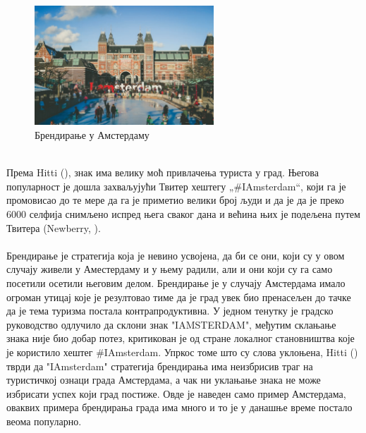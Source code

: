 \documentclass{article}
\begin{document}
\begin{figure}[h!]
\centering
\includegraphics[width=0.6\textwidth]{slike/amsterdam.png}
\caption{\label{fig:amsterdam}Брендирање у Амстердаму}
\end{figure}\\
Према Hitti (\cite{hitti_2018}), знак има велику моћ привлачења туриста у град. Његова популарност је дошла захваљујући Твитер хештегу „#IAmsterdam“, који га је промовисао до те мере да га је приметио велики број људи и да је да је преко 6000 селфија снимљено испред њега сваког дана и већина њих је подељена путем Твитера (Newberry, \cite{nb_2016}). \\\\
Брендирање је стратегија која је невино усвојена, да би се они, који су у овом случају живели у Аместердаму и у њему радили, али и они који су га само посетили осетили његовим делом. Брендирање је у случају Амстердама имало огроман утицај које је резултовао тиме да је град увек био пренасељен до тачке да је тема туризма постала контрапродуктивна. У једном тенутку је градско руководство одлучило да склони знак "IAMSTERDAM", међутим склањање знака није био добар потез, критикован је од стране локалног становништва које је користило хештег #IAmsterdam. Упркос томе што су слова уклоњена, Hitti (\cite{hitti_2018}) тврди да "IAmsterdam" стратегија брендирања има неизбрисив траг на туристичкој ознаци града Амстердама, а чак ни уклањање знака не може избрисати успех који град постиже. Овде је наведен само пример Амстердама, оваквих примера брендирања града има много и то је у данашње време постало веома популарно.
\\\\
\end{document}

